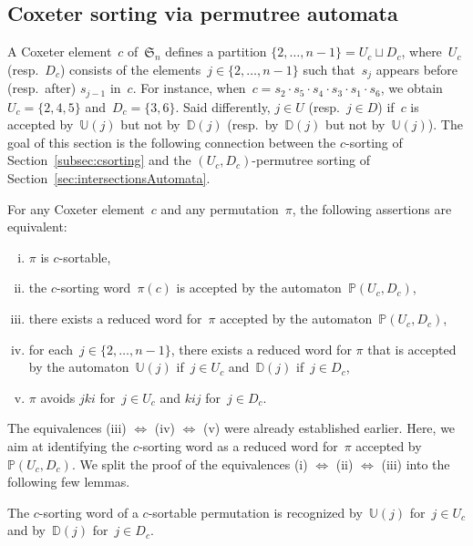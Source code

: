 \documentclass[ALCO]{cedram}
\newcommand{\fS}{\mathfrak{S}}
\newcommand{\automatonP}{\mathbb{P}}
\newcommand{\automatonU}{\mathbb{U}}
\newcommand{\automatonD}{\mathbb{D}}
\begin{document}
\subsection{Coxeter sorting via permutree automata}

A Coxeter element~$c$ of~$\fS_n$ defines a partition ${\{2, \dots, n-1\} = U_c \sqcup D_c}$, where~$U_c$ (resp.~$D_c$) consists of the elements~$j \in \{2, \dots, n-1\}$ such that~$s_j$ appears before (resp.~after) $s_{j-1}$ in~$c$.
For instance, when~$c = s_2 \cdot s_5 \cdot s_4 \cdot s_3 \cdot s_1 \cdot s_6$, we obtain~$U_c = \{2,4,5\}$ and~$D_c = \{3,6\}$.
Said differently, $j \in U$ (resp.~$j \in D$) if~$c$ is accepted by~$\automatonU(j)$ but not by~$\automatonD(j)$ (resp.~by~$\automatonD(j)$ but not by~$\automatonU(j)$).
The goal of this section is the following connection between the $c$-sorting of Section~\ref{subsec:csorting} and the $(U_c, D_c)$-permutree sorting of Section~\ref{sec:intersectionsAutomata}.

\begin{theorem}
\label{thm:csorting}
For any Coxeter element~$c$ and any permutation~$\pi$, the following assertions are equivalent:
\begin{enumerate}[(i)]
	\item $\pi$ is $c$-sortable,
	\item the $c$-sorting word~$\pi(c)$ is accepted by the automaton~$\automatonP(U_c, D_c)$,
	\item there exists a reduced word for~$\pi$ accepted by the automaton~$\automatonP(U_c, D_c)$,
	\item for each~$j \in \{2, \dots, n-1\}$, there exists a reduced word for $\pi$ that is accepted by the automaton~$\automatonU(j)$ if~$j \in U_c$ and~$\automatonD(j)$ if~$j \in D_c$,
	\item $\pi$ avoids $jki$ for~$j \in U_c$ and $kij$ for~$j \in D_c$.
\end{enumerate}
\end{theorem}

The equivalences (iii) $\iff$ (iv) $\iff$ (v) were already established earlier.
Here, we aim at identifying the $c$-sorting word as a reduced word for~$\pi$ accepted by~$\automatonP(U_c, D_c)$.
We split the proof of the equivalences (i) $\iff$ (ii) $\iff$ (iii) into the following few lemmas.

\begin{lemma}\label{lem:vincent9}
The $c$-sorting word of a $c$-sortable permutation is recognized by~$\automatonU(j)$ for~$j \in U_c$ and by~$\automatonD(j)$ for~$j \in D_c$.
\end{lemma}
\end{document}
